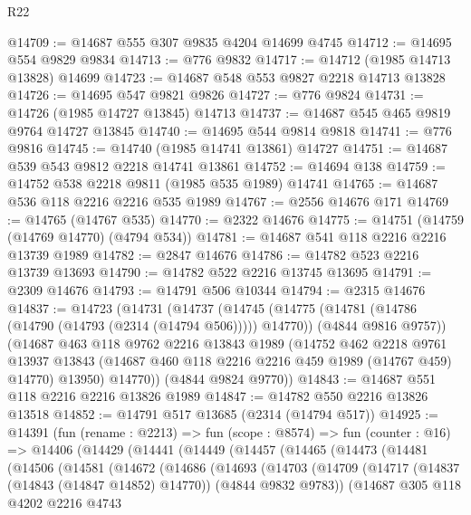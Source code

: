 \begin{lexlean}{R22}
\begin{coremodule}
@14709 := @14687 @555 @307 @9835 @4204 @14699 @4745
@14712 := @14695 @554 @9829 @9834
@14713 := @776 @9832
@14717 := @14712 (@1985 @14713 @13828) @14699
@14723 := @14687 @548 @553 @9827 @2218 @14713 @13828
@14726 := @14695 @547 @9821 @9826
@14727 := @776 @9824
@14731 := @14726 (@1985 @14727 @13845) @14713
@14737 := @14687 @545 @465 @9819 @9764 @14727 @13845
@14740 := @14695 @544 @9814 @9818
@14741 := @776 @9816
@14745 := @14740 (@1985 @14741 @13861) @14727
@14751 := @14687 @539 @543 @9812 @2218 @14741 @13861
@14752 := @14694 @138
@14759 := @14752 @538 @2218 @9811 (@1985 @535 @1989) @14741
@14765 := @14687 @536 @118 @2216 @2216 @535 @1989
@14767 := @2556 @14676 @171
@14769 := @14765 (@14767 @535)
@14770 := @2322 @14676
@14775 := @14751 (@14759 (@14769 @14770) (@4794 @534))
@14781 := @14687 @541 @118 @2216 @2216 @13739 @1989
@14782 := @2847 @14676
@14786 := @14782 @523 @2216 @13739 @13693
@14790 := @14782 @522 @2216 @13745 @13695
@14791 := @2309 @14676
@14793 := @14791 @506 @10344
@14794 := @2315 @14676
@14837 := @14723
    (@14731
      (@14737
        (@14745
          (@14775 (@14781 (@14786 (@14790 (@14793 (@2314 (@14794 @506))))) @14770))
          (@4844 @9816 @9757))
        (@14687
          @463
          @118
          @9762
          @2216
          @13843
          @1989
          (@14752
            @462
            @2218
            @9761
            @13937
            @13843
            (@14687 @460 @118 @2216 @2216 @459 @1989 (@14767 @459) @14770)
            @13950)
          @14770))
      (@4844 @9824 @9770))
@14843 := @14687 @551 @118 @2216 @2216 @13826 @1989
@14847 := @14782 @550 @2216 @13826 @13518
@14852 := @14791 @517 @13685 (@2314 (@14794 @517))
@14925 := @14391
    (fun (rename : @2213) =>
    fun (scope : @8574) =>
    fun (counter : @16) =>
    @14406
      (@14429
        (@14441
          (@14449
            (@14457
              (@14465
                (@14473
                  (@14481
                    (@14506
                      (@14581
                        (@14672
                          (@14686
                            (@14693
                              (@14703
                                (@14709
                                  (@14717
                                    (@14837 (@14843 (@14847 @14852) @14770))
                                    (@4844 @9832 @9783))
                                  (@14687
                                    @305
                                    @118
                                    @4202
                                    @2216
                                    @4743

\end{coremodule}
\end{lexlean}
